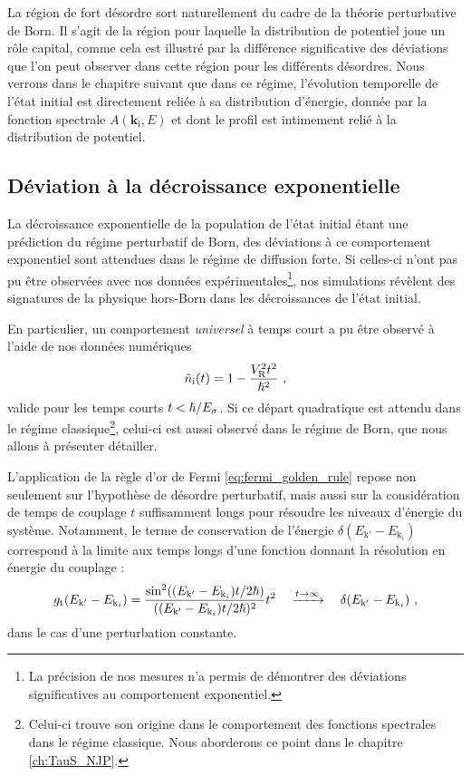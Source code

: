 La région de fort désordre sort naturellement du cadre de la théorie perturbative de Born. Il s'agit de la région pour laquelle la distribution de potentiel joue un rôle capital, comme cela est illustré par la différence significative des déviations que l'on peut observer dans cette région pour les différents désordres. Nous verrons dans le chapitre suivant que dans ce régime, l'évolution temporelle de l'état initial est directement reliée à sa distribution d'énergie, donnée par la fonction spectrale $A(\mathbf{k}_{\mathrm{i}},E)$ et dont le profil est intimement relié à la distribution de potentiel.


\subsection{Déviation à la décroissance exponentielle}
La décroissance exponentielle de la population de l'état initial étant une prédiction du régime perturbatif de Born, des déviations à ce comportement exponentiel sont attendues dans le régime de diffusion forte. Si celles-ci n'ont pas pu être observées avec nos données expérimentales\footnote{La précision de nos mesures n'a permis de démontrer des déviations significatives au comportement exponentiel.}, nos simulations révèlent des signatures de la physique hors-Born dans les décroissances de l'état initial.

En particulier, un comportement \emph{universel} à temps court a pu être observé à l'aide de nos données numériques
\begin{equation}
\tilde{n}_{\mathrm{i}}(t)=1-\frac{V_{\mathrm{R}}^2t^2}{\hslash^2} \text{ ,}
\label{eq:depart_quadratique}
\end{equation}
valide pour les temps courts $t<\hslash/E_{\sigma}$. Si ce départ quadratique est attendu dans le régime classique\footnote{Celui-ci trouve son origine dans le comportement des fonctions spectrales dans le régime classique. Nous aborderons ce point dans le chapitre \ref{ch:TauS_NJP}.}, celui-ci est aussi observé dans le régime de Born, que nous allons à présenter détailler.

L'application de la règle d'or de Fermi \ref{eq:fermi_golden_rule} repose non seulement sur l'hypothèse de désordre perturbatif, mais aussi sur la considération de temps de couplage $t$ suffisamment longs pour résoudre les niveaux d'énergie du système. Notamment, le terme de conservation de l'énergie $\delta(E_{\mathrm{k}'} - E_{\mathrm{k}_i})$ correspond à la limite aux temps longs d'une fonction donnant la résolution en énergie du couplage \citep{grynberg2010introduction}:
\begin{equation}
g_{\mathrm{t}}(E_{\mathrm{k}'} - E_{\mathrm{k}_i}) = \frac{\sin^2((E_{\mathrm{k}'} - E_{\mathrm{k}_i})t/2\hslash)}{((E_{\mathrm{k}'} - E_{\mathrm{k}_i})t/2\hslash)^2} t^2 \quad \xrightarrow{t\to\infty} \quad \delta(E_{\mathrm{k}'} - E_{\mathrm{k}_i}) \text{ ,}
\end{equation}
dans le cas d'une perturbation constante.

